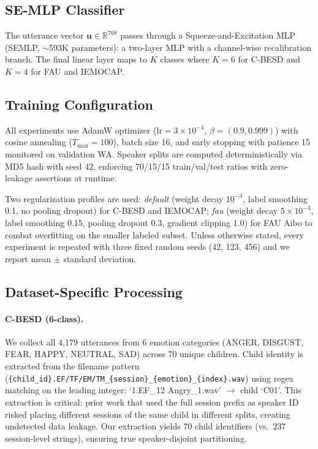 \subsection{SE-MLP Classifier}
\label{ssec:classifier}

The utterance vector $\mathbf{u} \in \mathbb{R}^{768}$ passes through a
Squeeze-and-Excitation MLP (SEMLP, $\sim$593K parameters): a two-layer MLP
with a channel-wise recalibration branch. The final linear layer maps to $K$
classes where $K=6$ for C-BESD and $K=4$ for FAU and IEMOCAP.

\subsection{Training Configuration}
\label{ssec:training}

All experiments use AdamW optimizer ($\text{lr}=3\times 10^{-4}$,
$\beta=(0.9,0.999)$) with cosine annealing ($T_{\text{max}}=100$), batch size
16, and early stopping with patience 15 monitored on validation WA. Speaker
splits are computed deterministically via MD5 hash with seed 42, enforcing
70/15/15 train/val/test ratios with zero-leakage assertions at runtime.

Two regularization profiles are used: \textit{default} (weight decay
$10^{-3}$, label smoothing 0.1, no pooling dropout) for C-BESD and IEMOCAP;
\textit{fau} (weight decay $5\times 10^{-3}$, label smoothing 0.15, pooling
dropout 0.3, gradient clipping 1.0) for FAU Aibo to combat overfitting on the
smaller labeled subset. Unless otherwise stated, every experiment is repeated
with three fixed random seeds (42, 123, 456) and we report mean $\pm$ standard
deviation.

\subsection{Dataset-Specific Processing}
\label{ssec:datasets}

\paragraph{C-BESD (6-class).} We collect all 4,179 utterances from 6 emotion
categories (ANGER, DISGUST, FEAR, HAPPY, NEUTRAL, SAD) across 70 unique
children. Child identity is extracted from the filename pattern
(\texttt{\{child\_id\}.EF/TF/EM/TM\_\{session\}\_\{emotion\}\_\{index\}.wav})
using regex matching on the leading integer: `1.EF\_12 Angry\_1.wav'
$\rightarrow$ child `C01'. This extraction is critical: prior work that used
the full session prefix as speaker ID risked placing different sessions of the
same child in different splits, creating undetected data leakage. Our
extraction yields 70 child identifiers (vs.\ 237 session-level strings),
ensuring true speaker-disjoint partitioning.


